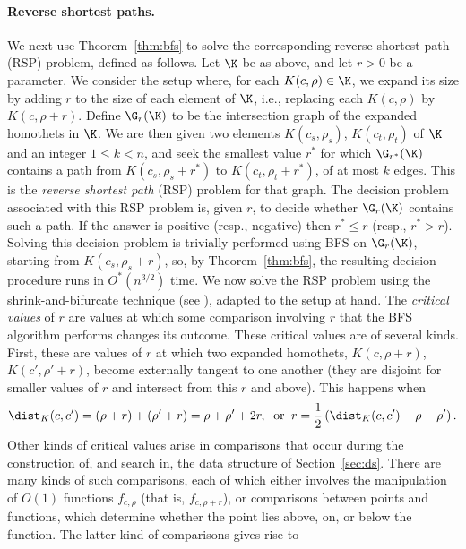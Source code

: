 \paragraph{Reverse shortest paths.}
We next use Theorem~\ref{thm:bfs} to solve the corresponding reverse shortest path (RSP) problem,
defined as follows.
Let $\K$ be as above, and let $r>0$ be a parameter. We consider the setup where, for each 
$K(c,\rho)\in\K$, we expand its size by adding $r$ to the size of each element of $\K$, 
i.e., replacing each $K(c,\rho)$ by $K(c,\rho+r)$.
Define $\G_r(\K)$ to
be the intersection graph of the expanded homothets in $\K$. We are then given two elements
$K(c_s,\rho_s)$, $K(c_t,\rho_t)$ of $\K$ and an integer $1\le k < n$, and seek the smallest value
$r^*$ for which $\G_{r^*}(\K)$ contains a path from $K(c_s,\rho_s+r^*)$ to $K(c_t,\rho_t+r^*)$,
of at most $k$ edges. This is the \emph{reverse shortest path} (RSP) problem for that graph.
%
The decision problem associated with this RSP problem is, given $r$, to decide whether $\G_r(\K)$
contains such a path. If the answer is positive (resp., negative) then $r^*\le r$ (resp.,
$r^* > r$). Solving this decision problem is trivially performed using BFS on $\G_r(\K)$, 
starting from $K(c_s,\rho_s+r)$, so, by Theorem~\ref{thm:bfs}, the resulting decision procedure
runs in $O^*(n^{3/2})$ time.
%
We now solve the RSP problem using the shrink-and-bifurcate technique (see \cite{BFKKS,CH,KKSS}),
adapted to the setup at hand. The \emph{critical values} of $r$ are values at which some comparison involving
$r$ that the BFS algorithm performs changes its outcome. These critical values are of several kinds. 
First, these are 
values of $r$ at which two expanded homothets, $K(c,\rho+r)$, $K(c',\rho'+r)$, become externally 
tangent to one another (they are disjoint for smaller values of $r$ and intersect from this $r$ 
and above). This happens when
\begin{equation} \label{eq:crit} 
\dist_K(c,c') = (\rho+r) + (\rho'+r) = \rho + \rho' + 2r, \;\;\text{or} \;\; 
r = \frac12 \left( \dist_K(c,c') - \rho - \rho' \right) .
\end{equation}
%
Other kinds of critical values arise in comparisons that occur during the construction of, and 
search in, the data structure of Section~\ref{sec:ds}. There are many kinds of such comparisons,
each of which either involves the manipulation of $O(1)$ functions $f_{c,\rho}$ (that is, 
$f_{c,\rho+r}$), or comparisons between points and functions, which determine whether the
point lies above, on, or below the function. The latter kind of comparisons gives rise to

